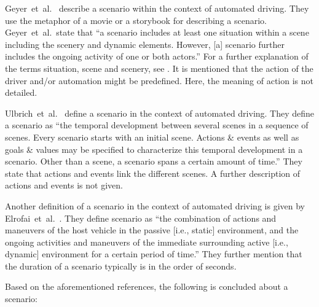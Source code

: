 Geyer~et~al.~\cite{geyer2014} describe a scenario within the context of automated driving. They use the metaphor of a movie or a storybook for describing a scenario. Geyer~et~al.\ state that ``a scenario includes at least one situation within a scene including the scenery and dynamic elements. However, [a] scenario further includes the ongoing activity of one or both actors.'' For a further explanation of the terms situation, scene and scenery, see \cite{geyer2014}. It is mentioned that the action of the driver and/or automation might be predefined. Here, the meaning of action is not detailed.

Ulbrich~et~al.~\cite{ulbrich2015} define a scenario in the context of automated driving. They define a scenario as ``the temporal development between several scenes in a sequence of scenes. Every scenario starts with an initial scene. Actions \& events as well as goals \& values may be specified to characterize this temporal development in a scenario. Other than a scene, a scenario spans a certain amount of time.'' They state that actions and events link the different scenes. A further description of actions and events is not given.

Another definition of a scenario in the context of automated driving is given by Elrofai~et~al.~\cite{elrofai2016scenario}. They define scenario as ``the combination of actions and maneuvers of the host vehicle in the passive [i.e., static] environment, and the ongoing activities and maneuvers of the immediate surrounding active [i.e., dynamic] environment for a certain period of time.'' They further mention that the duration of a scenario typically is in the order of seconds.

Based on the aforementioned references, the following is concluded about a scenario:


